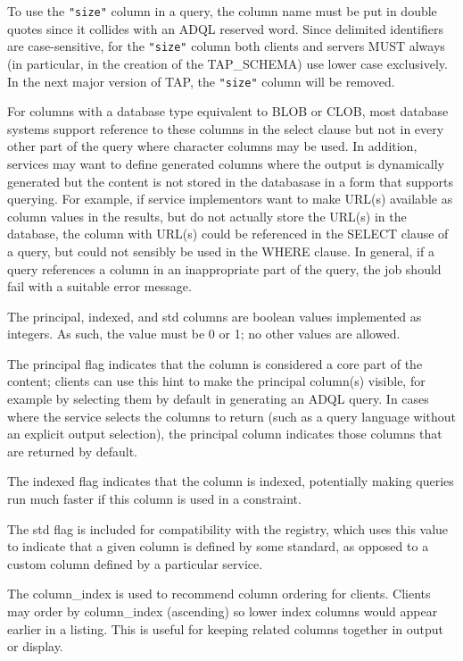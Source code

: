 \documentclass[11pt,letter]{ivoa}
\newcommand{\tapschema}{TAP\_SCHEMA}
\newcommand{\tapschema}{\mbox{%
  \relsize{-0.5}TAP\discretionary{-}{}{\kern-2pt\_}SCHEMA}}
\begin{document}
To use the \verb|"size"| column in a query, the column name must be put in double quotes since 
it collides with an ADQL reserved word. Since delimited identifiers are case-sensitive, for the 
\verb|"size"| column both
clients and servers MUST always (in particular, in the creation of the 
\tapschema) use lower case exclusively. In the next major version 
of TAP, the \verb|"size"| column will be removed.

For columns with a database type equivalent to BLOB or CLOB, most database systems support
reference to these columns in the select clause but not in every other part of the query where
character columns may be used. In addition, services may want to define generated columns where the output is dynamically generated but the content is not stored in the 
databasase in a form that supports querying. For example, if service implementors want to make
URL(s) available as column values in the results, but do not actually store the URL(s) in the
database, the column with URL(s) could be referenced in the SELECT clause of a query, but could
not sensibly be used in the WHERE clause. In general, if a query references a column in an 
inappropriate part of the query, the job should fail with a suitable error message.

The principal, indexed, and std columns are boolean values implemented as integers. As such, 
the value must be 0 or 1; no other values are allowed.

The principal flag indicates that the column is considered a core part of the 
content; clients can use this hint to make the principal column(s) visible, for 
example by selecting them by default in generating an ADQL query. In cases where 
the service selects the columns to return (such as a query language without an 
explicit output selection), the principal column indicates those columns that 
are returned by default. 

The indexed flag indicates that the column is indexed, potentially 
making queries run much faster if this column is used in a constraint. 

The std flag is included for compatibility with the registry, which uses this value 
to indicate that a given column is defined by some standard, as opposed to a 
custom column defined by a particular service.

The column\_index is used to recommend column ordering for clients. Clients 
may order by column\_index (ascending) so lower index columns would appear 
earlier in a listing. This is useful for keeping related columns together in 
output or display.
\end{document}
